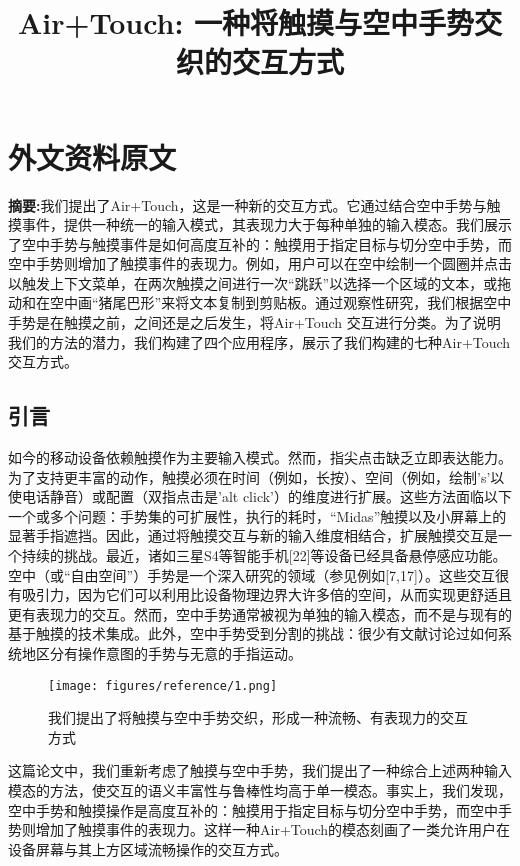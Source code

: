 \chapter{外文资料原文}
\label{cha:engorg}

\title{Air+Touch: 一种将触摸与空中手势交织的交互方式}

\textbf{摘要:}我们提出了Air+Touch，这是一种新的交互方式。它通过结合空中手势与触摸事件，提供一种统一的输入模式，其表现力大于每种单独的输入模态。我们展示了空中手势与触摸事件是如何高度互补的：触摸用于指定目标与切分空中手势，而空中手势则增加了触摸事件的表现力。例如，用户可以在空中绘制一个圆圈并点击以触发上下文菜单，在两次触摸之间进行一次“跳跃”以选择一个区域的文本，或拖动和在空中画“猪尾巴形”来将文本复制到剪贴板。通过观察性研究，我们根据空中手势是在触摸之前，之间还是之后发生，将Air+Touch 交互进行分类。为了说明我们的方法的潜力，我们构建了四个应用程序，展示了我们构建的七种Air+Touch交互方式。




\section{引言}

如今的移动设备依赖触摸作为主要输入模式。然而，指尖点击缺乏立即表达能力。为了支持更丰富的动作，触摸必须在时间（例如，长按）、空间（例如，绘制's'以使电话静音）或配置（双指点击是'alt click'）的维度进行扩展。这些方法面临以下一个或多个问题：手势集的可扩展性，执行的耗时，“Midas”触摸以及小屏幕上的显著手指遮挡。因此，通过将触摸交互与新的输入维度相结合，扩展触摸交互是一个持续的挑战。最近，诸如三星S4等智能手机[22]等设备已经具备悬停感应功能。空中（或“自由空间”）手势是一个深入研究的领域（参见例如[7,17]）。这些交互很有吸引力，因为它们可以利用比设备物理边界大许多倍的空间，从而实现更舒适且更有表现力的交互。然而，空中手势通常被视为单独的输入模态，而不是与现有的基于触摸的技术集成。此外，空中手势受到分割的挑战：很少有文献讨论过如何系统地区分有操作意图的手势与无意的手指运动。

\begin{figure}
\centering
\texttt{[image: figures/reference/1.png]}
\caption{我们提出了将触摸与空中手势交织，形成一种流畅、有表现力的交互方式}
\label{fig:ref_1}
\end{figure}

这篇论文中，我们重新考虑了触摸与空中手势，我们提出了一种综合上述两种输入模态的方法，使交互的语义丰富性与鲁棒性均高于单一模态。事实上，我们发现，空中手势和触摸操作是高度互补的：触摸用于指定目标与切分空中手势，而空中手势则增加了触摸事件的表现力。这样一种Air+Touch的模态刻画了一类允许用户在设备屏幕与其上方区域流畅操作的交互方式。

